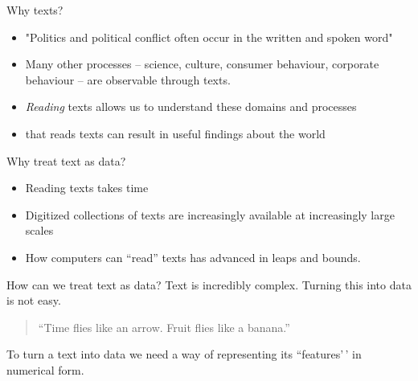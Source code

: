 \documentclass[
  10pt,
  ignorenonframetext,
  aspectratio=169]{beamer}
\begin{document}
\begin{frame}{Why texts?}
\protect\hypertarget{why-texts}{}
\begin{itemize}
  \item<1-> "Politics and political conflict often occur in the written and spoken word" \citep{grimmer_text_2013}
  \item<2-> Many other processes -- science, culture, consumer behaviour, corporate behaviour --  are observable through texts. 
  \item<3-> \textit{Reading} texts allows us to understand these domains and processes
  \item<4->  that reads texts can result in useful findings about the world
\end{itemize}

\end{frame}

\begin{frame}{Why treat text as data?}
\protect\hypertarget{why-treat-text-as-data}{}
\begin{itemize}
  \item<1-> Reading texts takes time
  \item<2-> Digitized collections of texts are increasingly available at increasingly large scales
  \item<3-> How computers can ``read'' texts has advanced in leaps and bounds.
\end{itemize}
\end{frame}

\begin{frame}{How can we treat text as data?}
\protect\hypertarget{how-can-we-treat-text-as-data}{}
Text is incredibly complex. Turning this into data is not easy.

\medskip 
\begin{quote}
``Time flies like an arrow. Fruit flies like a banana.''
\end{quote}

\bigskip

To turn a text into data we need a way of representing its
``features'\,' in numerical form.

\end{frame}
\end{document}
